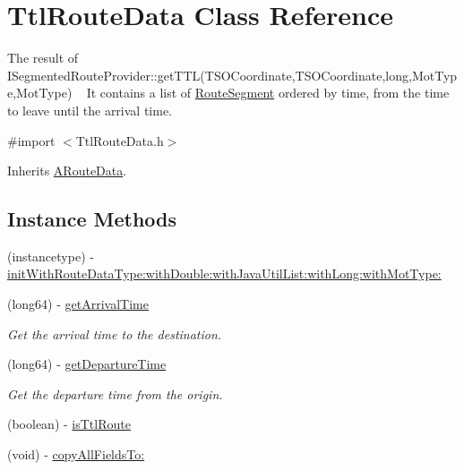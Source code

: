 \hypertarget{interface_ttl_route_data}{}\section{Ttl\+Route\+Data Class Reference}
\label{interface_ttl_route_data}


The result of I\+Segmented\+Route\+Provider\+::get\+T\+T\+L(\+T\+S\+O\+Coordinate,\+T\+S\+O\+Coordinate,long,\+Mot\+Type,\+Mot\+Type) ~\newline
 It contains a list of \hyperlink{interface_route_segment}{Route\+Segment} ordered by time, from the time to leave until the arrival time.  




{\ttfamily \#import $<$Ttl\+Route\+Data.\+h$>$}



Inherits \hyperlink{interface_a_route_data}{A\+Route\+Data}.

\subsection*{Instance Methods}
\begin{DoxyCompactItemize}
\item 
(instancetype) -\/ \hyperlink{interface_ttl_route_data_a9f4702311632ab8425b5a53fab6f96f4}{init\+With\+Route\+Data\+Type\+:with\+Double\+:with\+Java\+Util\+List\+:with\+Long\+:with\+Mot\+Type\+:}
\item 
(long64) -\/ \hyperlink{interface_ttl_route_data_ab4e0da7fdcf2d55436e1a912607e0106}{get\+Arrival\+Time}
\begin{DoxyCompactList}\small\item\em Get the arrival time to the destination. \end{DoxyCompactList}\item 
(long64) -\/ \hyperlink{interface_ttl_route_data_a9c7cea559bde28b030f7f3ea77d2199d}{get\+Departure\+Time}
\begin{DoxyCompactList}\small\item\em Get the departure time from the origin. \end{DoxyCompactList}\item 
(boolean) -\/ \hyperlink{interface_ttl_route_data_a3fbad490f2868e4393b1c1a087256fab}{is\+Ttl\+Route}
\item 
(void) -\/ \hyperlink{interface_ttl_route_data_a8fb823aee662ff58d871ab1807000598}{copy\+All\+Fields\+To\+:}
\end{DoxyCompactItemize}
